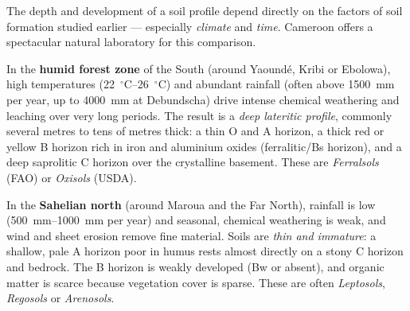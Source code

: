 \documentclass[11pt]{article}
\begin{document}
The depth and development of a soil profile depend directly on the factors of soil formation studied earlier --- especially \emph{climate} and \emph{time}. Cameroon offers a spectacular natural laboratory for this comparison.

In the \textbf{humid forest zone} of the South (around Yaoundé, Kribi or Ebolowa), high temperatures (\SIrange{22}{26}{\ensuremath{{}^{\circ}\mathrm{C}}}) and abundant rainfall (often above \SI{1500}{mm} per year, up to \SI{4000}{mm} at Debundscha) drive intense chemical weathering and leaching over very long periods. The result is a \emph{deep lateritic profile}, commonly several metres to tens of metres thick: a thin O and A horizon, a thick red or yellow B horizon rich in iron and aluminium oxides (ferralitic/Bs horizon), and a deep saprolitic C horizon over the crystalline basement. These are \emph{Ferralsols} (FAO) or \emph{Oxisols} (USDA).

In the \textbf{Sahelian north} (around Maroua and the Far North), rainfall is low (\SIrange{500}{1000}{mm} per year) and seasonal, chemical weathering is weak, and wind and sheet erosion remove fine material. Soils are \emph{thin and immature}: a shallow, pale A horizon poor in humus rests almost directly on a stony C horizon and bedrock. The B horizon is weakly developed (Bw or absent), and organic matter is scarce because vegetation cover is sparse. These are often \emph{Leptosols}, \emph{Regosols} or \emph{Arenosols}.
\end{document}

